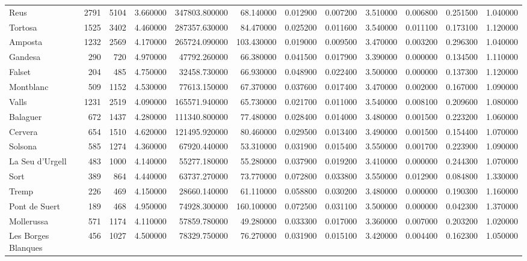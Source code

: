 \documentclass{article}
\begin{document}
\begin{table}[ht]
\begin{tabular}{lrrrrrrrrrrr}
Reus & 2791 & 5104 & 3.660000 & 347803.800000 & 68.140000 & 0.012900 & 0.007200 & 3.510000 & 0.006800 & 0.251500 & 1.040000 \\
Tortosa & 1525 & 3402 & 4.460000 & 287357.630000 & 84.470000 & 0.025200 & 0.011600 & 3.540000 & 0.011100 & 0.173100 & 1.120000 \\
Amposta & 1232 & 2569 & 4.170000 & 265724.090000 & 103.430000 & 0.019000 & 0.009500 & 3.470000 & 0.003200 & 0.296300 & 1.040000 \\
Gandesa & 290 & 720 & 4.970000 & 47792.260000 & 66.380000 & 0.041500 & 0.017900 & 3.390000 & 0.000000 & 0.134500 & 1.110000 \\
Falset & 204 & 485 & 4.750000 & 32458.730000 & 66.930000 & 0.048900 & 0.022400 & 3.500000 & 0.000000 & 0.137300 & 1.120000 \\
Montblanc & 509 & 1152 & 4.530000 & 77613.150000 & 67.370000 & 0.037600 & 0.017400 & 3.470000 & 0.002000 & 0.167000 & 1.090000 \\
Valls & 1231 & 2519 & 4.090000 & 165571.940000 & 65.730000 & 0.021700 & 0.011000 & 3.540000 & 0.008100 & 0.209600 & 1.080000 \\
Balaguer & 672 & 1437 & 4.280000 & 111340.800000 & 77.480000 & 0.028400 & 0.014000 & 3.480000 & 0.001500 & 0.223200 & 1.060000 \\
Cervera & 654 & 1510 & 4.620000 & 121495.920000 & 80.460000 & 0.029500 & 0.013400 & 3.490000 & 0.001500 & 0.154400 & 1.070000 \\
Solsona & 585 & 1274 & 4.360000 & 67920.440000 & 53.310000 & 0.031900 & 0.015400 & 3.550000 & 0.001700 & 0.223900 & 1.090000 \\
La Seu d'Urgell & 483 & 1000 & 4.140000 & 55277.180000 & 55.280000 & 0.037900 & 0.019200 & 3.410000 & 0.000000 & 0.244300 & 1.070000 \\
Sort & 389 & 864 & 4.440000 & 63737.270000 & 73.770000 & 0.072800 & 0.033800 & 3.550000 & 0.012900 & 0.084800 & 1.330000 \\
Tremp & 226 & 469 & 4.150000 & 28660.140000 & 61.110000 & 0.058800 & 0.030200 & 3.480000 & 0.000000 & 0.190300 & 1.160000 \\
Pont de Suert & 189 & 468 & 4.950000 & 74928.300000 & 160.100000 & 0.072500 & 0.031100 & 3.500000 & 0.000000 & 0.042300 & 1.370000 \\
Mollerussa & 571 & 1174 & 4.110000 & 57859.780000 & 49.280000 & 0.033300 & 0.017000 & 3.360000 & 0.007000 & 0.203200 & 1.020000 \\
Les Borges Blanques & 456 & 1027 & 4.500000 & 78329.750000 & 76.270000 & 0.031900 & 0.015100 & 3.420000 & 0.004400 & 0.162300 & 1.050000 \\

\end{tabular}
\end{table}
\end{document}
